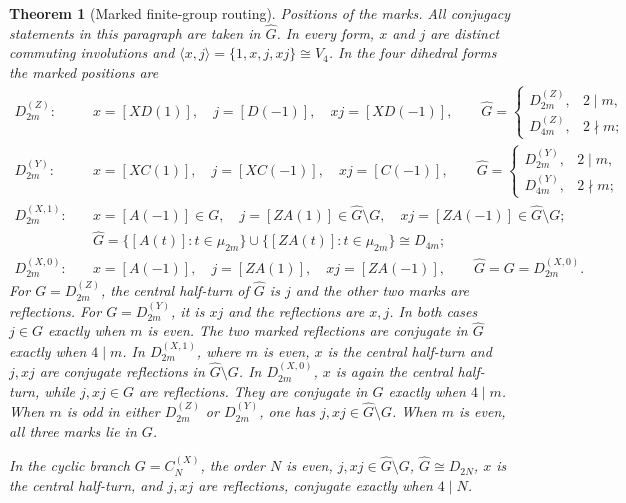 \documentclass[11pt,letterpaper,onecolumn]{article}
\theoremstyle{plain}
\newtheorem{theorem}{Theorem}[section]
\theoremstyle{definition}
\theoremstyle{remark}
\newcommand{\DihZ}[1]{{D_{#1}^{(Z)}}}
\newcommand{\DihY}[1]{{D_{#1}^{(Y)}}}
\newcommand{\DihXzero}[1]{{D_{#1}^{(X,0)}}}
\newcommand{\DihXone}[1]{{D_{#1}^{(X,1)}}}
\newcommand{\CycX}[1]{{C_{#1}^{(X)}}}
\begin{document}
\begin{theorem}[Marked finite-group routing]
\smallskip
\noindent\emph{Positions of the marks.}
All conjugacy statements in this paragraph are taken in \(\widehat G\).  In every
form, \(x\) and \(j\) are distinct commuting involutions and
\(\langle x,j\rangle=\{1,x,j,xj\}\cong V_4\).  In the four dihedral forms the
marked positions are
\begin{align*}
 \DihZ{2m}:&\quad
 x=[XD(1)],\quad j=[D(-1)],\quad xj=[XD(-1)],\qquad
 \widehat G=\begin{cases}\DihZ{2m},&2\mid m,\\ \DihZ{4m},&2\nmid m;\end{cases}\\
 \DihY{2m}:&\quad
 x=[XC(1)],\quad j=[XC(-1)],\quad xj=[C(-1)],\qquad
 \widehat G=\begin{cases}\DihY{2m},&2\mid m,\\ \DihY{4m},&2\nmid m;\end{cases}\\
 \DihXone{2m}:&\quad
 x=[A(-1)]\in G,\quad j=[ZA(1)]\in \widehat G\setminus G,\quad
 xj=[ZA(-1)]\in \widehat G\setminus G;\\[-2pt]
 &\quad
 \widehat G=\{[A(t)]:t\in\mu_{2m}\}\cup
   \{[ZA(t)]:t\in\mu_{2m}\}\cong D_{4m};\\
 \DihXzero{2m}:&\quad
 x=[A(-1)],\quad j=[ZA(1)],\quad xj=[ZA(-1)],\qquad
 \widehat G=G=\DihXzero{2m}.
\end{align*}
For \(G=\DihZ{2m}\), the central half-turn of \(\widehat G\) is \(j\) and the other two marks are reflections.
For \(G=\DihY{2m}\), it is \(xj\) and the reflections are \(x,j\).
In both cases \(j\in G\) exactly when \(m\) is even. The two marked reflections are conjugate in \(\widehat G\) exactly when \(4\mid m\). In
\(\DihXone{2m}\), where \(m\) is even, \(x\) is the central half-turn and
\(j,xj\) are conjugate reflections in \(\widehat G\setminus G\).
In \(\DihXzero{2m}\), \(x\) is again the central half-turn, while
\(j,xj\in G\) are reflections. They are conjugate in \(G\) exactly when
\(4\mid m\).
When \(m\) is odd in either \(\DihZ{2m}\) or \(\DihY{2m}\), one has
\(j,xj\in \widehat G\setminus G\). When \(m\) is even, all three marks lie in \(G\).

In the cyclic branch \(G=\CycX{N}\), the order \(N\) is even,
\(j,xj\in \widehat G\setminus G\), \(\widehat G\cong D_{2N}\), \(x\) is the central half-turn, and
\(j,xj\) are reflections, conjugate exactly when \(4\mid N\).


\end{theorem}
\end{document}
